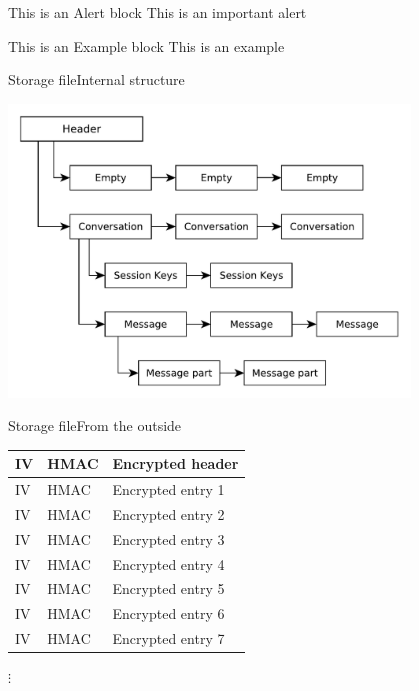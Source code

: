 \documentclass{beamer}
\newcommand{\txtStorageFile}{Storage file}
\begin{document}

\begin{frame}
 
 
   \begin{alertblock}{This is an Alert block}
   This is an important alert
   \end{alertblock}
 
   \begin{exampleblock}{This is an Example block}
   This is an example 
   \end{exampleblock}
 
\end{frame}


\begin{frame}{\txtStorageFile}{Internal structure}

	\centering
	\includegraphics[width=0.8\textwidth]{storage_file}
\end{frame}

\begin{frame}{\txtStorageFile}{From the outside}

	\begin{tabularx}{\textwidth}{ |l|l|L| }
		\hline
		IV & HMAC & Encrypted header \\
		\hline
		IV & HMAC & Encrypted entry 1 \\
		\hline
		IV & HMAC & Encrypted entry 2 \\
		\hline
		IV & HMAC & Encrypted entry 3 \\
		\hline
		IV & HMAC & Encrypted entry 4 \\
		\hline
		IV & HMAC & Encrypted entry 5 \\
		\hline
		IV & HMAC & Encrypted entry 6 \\
		\hline
		IV & HMAC & Encrypted entry 7 \\
		\hline
	\end{tabularx}

	\centering
	$\vdots$ \\
\end{frame}


\end{document}
